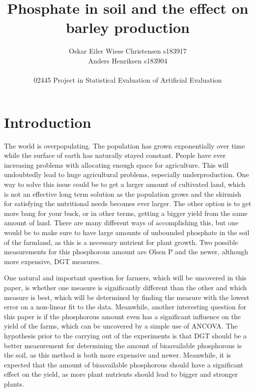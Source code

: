 \documentclass[11pt, fleqn, titlepage]{article}
\title{Phosphate in soil and the effect on barley production}
\author{Oskar Eiler Wiese Christensen s183917 \\ Anders Henriksen s183904 \\ \\ 02445 Project in Statistical Evaluation of Artificial Evaluation}
\date{\today \vspace{2.5cm} \section*{\small Summary} 
\justify{\footnotesize Farmers will need more effective agriculture as the population grows. This can be accomplished by optimizing the amount of bioavailable phosphorous in the soil. The purpose of this paper is to analyze two different measurements of phosphorous in the soil. The measurements are Olsen P and DGT. Furthermore, it is studied which measurement is better at describing the yield. A linear and non-linear Michaelis-Mentel model have been fit to the data to find the best possible measurement to use, and ANCOVA has been applied for finding the significance of phosphorous for the yield. These analyses have shown that DGT is the best of the two measurements and that phosphorous has a remarkably significant influence on the harvest yield. This shows that phosphorous measurements can be constructive in helping farmers estimate the yield. Meanwhile, when estimating this, DGT is the better of the measurements, though it also costs more, so farmers should take into consideration the cost-benefit of using DGT instead of Olsen P.}}
\begin{document}
\maketitle

\section{Introduction}
The world is overpopulating. The population has grown exponentially over time while the surface of earth has naturally stayed constant. People have ever increasing problems with allocating enough space for agriculture. This will undoubtedly lead to huge agricultural problems, especially underproduction. One way to solve this issue could be to get a larger amount of cultivated land, which is not an effective long term solution as the population grows and the skirmish for satisfying the nutritional needs becomes ever larger. The other option is to get more bang for your buck, or in other terms, getting a bigger yield from the same amount of land. There are many different ways of accomplishing this, but one would be to make sure to have large amounts of unbounded phosphate in the soil of the farmland, as this is a necessary nutrient for plant growth. Two possible measurements for this phosphorous amount are Olsen P and the newer, although more expensive, DGT measures. 

One natural and important question for farmers, which will be uncovered in this paper, is whether one measure is significantly different than the other and which measure is best, which will be determined by finding the measure with the lowest error on a non-linear fit to the data. Meanwhile, another interesting question for this paper is if the phosphorous amount even has a significant influence on the yield of the farms, which can be uncovered by a simple use of ANCOVA. The hypothesis prior to the carrying out of the experiments is that DGT should be a better measurement for determining the amount of bioavailable phosphorous is the soil, as this method is both more expensive and newer. Meanwhile, it is expected that the amount of bioavailable phosphorous should have a significant effect on the yield, as more plant nutrients should lead to bigger and stronger plants.
\end{document}
